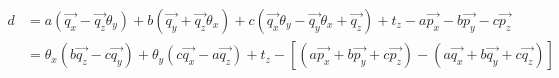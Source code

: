 \documentclass[a4paper,10pt]{scrreprt}
\begin{document}
\begin{equation}
\begin{aligned}
	d & = a (\vec{q_x} - \vec{q_z} \theta_y) + b (\vec{q_y} + \vec{q_z} \theta_x)+ c (\vec{q_x} \theta_y - \vec{q_y} \theta_x + \vec{q_z}) + t_z - a \vec{p_x} - b \vec{p_y} - c \vec{p_z} \\
	& = \theta_x (b \vec{q_z} - c \vec{q_y}) + \theta_y (c \vec{q_x} - a \vec{q_z}) + t_z - \left[ (a \vec{p_x} + b \vec{p_y} + c \vec{p_z}) - (a \vec{q_x} + b \vec{q_y} + c \vec{q_z}) \right]
\end{aligned}
\end{equation}



\end{document}
